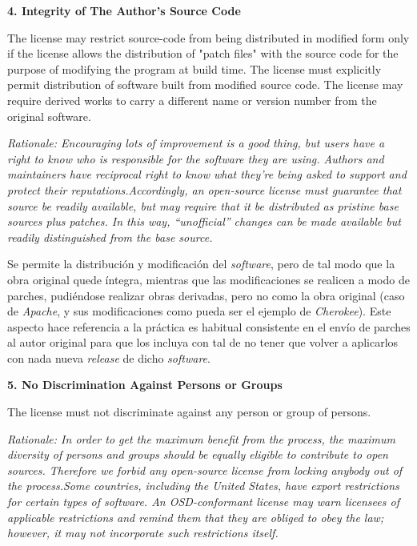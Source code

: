 {\bf 4. Integrity of The Author's Source Code

The license may restrict source-code from being distributed in modified form
only if the license allows the distribution of "patch files" with the source
code for the purpose of modifying the program at build time. The license must
explicitly permit distribution of software built from modified source code. The
license may require derived works to carry a different name or version number
from the original software.}

\textit{Rationale: Encouraging lots of improvement is a good thing, but users
have a right to know who is responsible for the software they are using. Authors
and maintainers have reciprocal right to know what they're being asked to
support and protect their reputations.\newline Accordingly, an open-source
license must guarantee that source be readily available, but may require that it
be distributed as pristine base sources plus patches. In this way,
``unofficial'' changes can be made available but readily distinguished from the
base source.}\newline

Se permite la distribución y modificación del \textit{software}, pero de tal
modo que la obra original quede íntegra, mientras que las modificaciones se
realicen a modo de parches, pudiéndose realizar obras derivadas, pero no como la
obra original (caso de \textit{Apache}, y sus modificaciones como pueda ser el
ejemplo de \textit{Cherokee}). Este aspecto hace referencia a la práctica es
habitual consistente en el envío de parches al autor original para que los
incluya con tal de no tener que volver a aplicarlos con nada nueva
\textit{release} de dicho \textit{software}.\newline

{\bf 5. No Discrimination Against Persons or Groups

The license must not discriminate against any person or group of persons.}

\textit{Rationale: In order to get the maximum benefit from the process, the
maximum diversity of persons and groups should be equally eligible to contribute
to open sources. Therefore we forbid any open-source license from locking
anybody out of the process.\newline Some countries, including the United States,
have export restrictions for certain types of software. An OSD-conformant
license may warn licensees of applicable restrictions and remind them that they
are obliged to obey the law; however, it may not incorporate such restrictions
itself.}\newline

